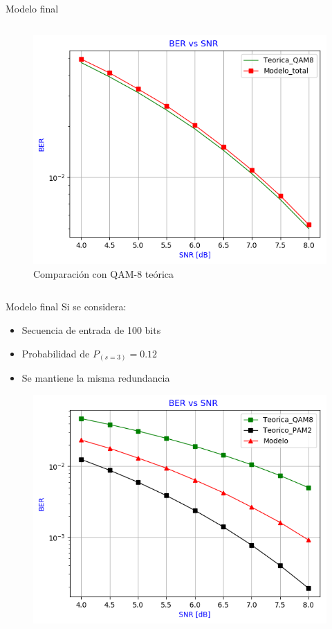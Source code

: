 \documentclass[xcolor=table]{beamer}
\begin{document}
\begin{frame}{Modelo final}
\begin{columns}
\begin{column}{0.48\paperwidth}
    \begin{figure}
        \centering
        \includegraphics[width=\textwidth]{Graficos/BER_vs_SNR_6.png}
        \caption{Comparación con QAM-8 teórica}
        \label{fig:my_label}
    \end{figure}
    
    \end{column}
\end{columns}
\end{frame}

\begin{frame}{Modelo final}
Si se considera:
\begin{itemize}
    \item Secuencia de entrada de 100 bits 
    \item Probabilidad de $P_{(s=3)} = 0.12$
    \item Se mantiene la misma redundancia
 \end{itemize}
 \begin{figure}
  \centering
  \includegraphics[width=0.6\paperwidth]{Graficos/BER_vs_SNR_8.png}%
\end{figure}
\end{frame}
\end{document}
